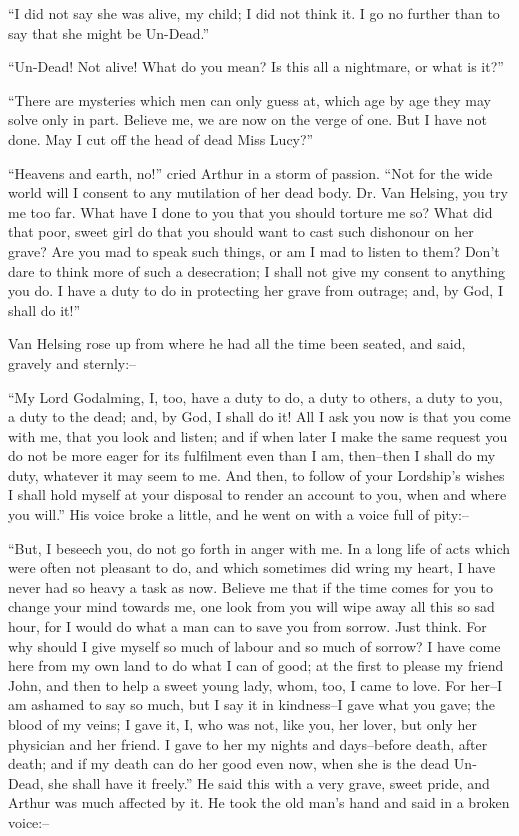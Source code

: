\documentclass[12pt,openright]{book}
\begin{document}
“I did not say she was alive, my child; I did not think it. I go no further than to say that she might be Un-Dead.”

“Un-Dead! Not alive! What do you mean? Is this all a nightmare, or what is it?”

“There are mysteries which men can only guess at, which age by age they may solve only in part. Believe me, we are now on the verge of one. But I have not done. May I cut off the head of dead Miss Lucy?”

“Heavens and earth, no!” cried Arthur in a storm of passion. “Not for the wide world will I consent to any mutilation of her dead body. Dr. Van Helsing, you try me too far. What have I done to you that you should torture me so? What did that poor, sweet girl do that you should want to cast such dishonour on her grave? Are you mad to speak such things, or am I mad to listen to them? Don’t dare to think more of such a desecration; I shall not give my consent to anything you do. I have a duty to do in protecting her grave from outrage; and, by God, I shall do it!”

Van Helsing rose up from where he had all the time been seated, and said, gravely and sternly:–

“My Lord Godalming, I, too, have a duty to do, a duty to others, a duty to you, a duty to the dead; and, by God, I shall do it! All I ask you now is that you come with me, that you look and listen; and if when later I make the same request you do not be more eager for its fulfilment even than I am, then–then I shall do my duty, whatever it may seem to me. And then, to follow of your Lordship’s wishes I shall hold myself at your disposal to render an account to you, when and where you will.” His voice broke a little, and he went on with a voice full of pity:–

“But, I beseech you, do not go forth in anger with me. In a long life of acts which were often not pleasant to do, and which sometimes did wring my heart, I have never had so heavy a task as now. Believe me that if the time comes for you to change your mind towards me, one look from you will wipe away all this so sad hour, for I would do what a man can to save you from sorrow. Just think. For why should I give myself so much of labour and so much of sorrow? I have come here from my own land to do what I can of good; at the first to please my friend John, and then to help a sweet young lady, whom, too, I came to love. For her–I am ashamed to say so much, but I say it in kindness–I gave what you gave; the blood of my veins; I gave it, I, who was not, like you, her lover, but only her physician and her friend. I gave to her my nights and days–before death, after death; and if my death can do her good even now, when she is the dead Un-Dead, she shall have it freely.” He said this with a very grave, sweet pride, and Arthur was much affected by it. He took the old man’s hand and said in a broken voice:–
\end{document}
